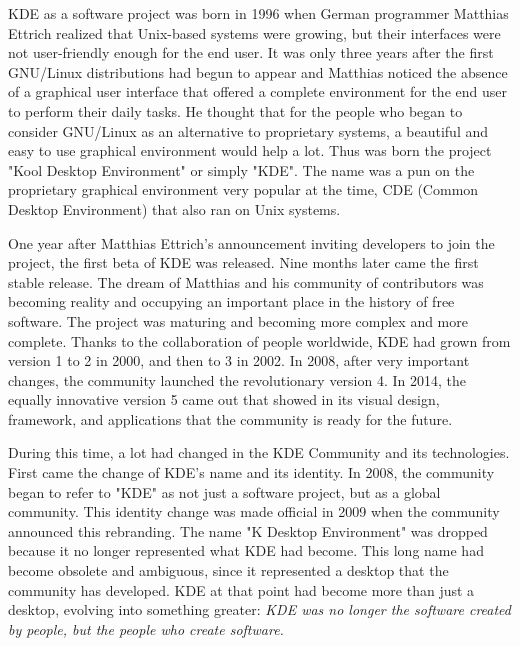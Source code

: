 

\noindent{}KDE as a software project was born in 1996 when German programmer Matthias Ettrich realized that Unix-based systems were growing, but their interfaces were not user-friendly enough for the end user. It was only three years after the first GNU/Linux distributions had begun to appear and Matthias noticed the absence of a graphical user interface that offered a complete environment for the end user to perform their daily tasks. He thought that for the people who began to consider GNU/Linux as an alternative to proprietary systems, a beautiful and easy to use graphical environment would help a lot. Thus was born the project "Kool Desktop Environment" or simply "KDE". The name was a pun on the proprietary graphical environment very popular at the time, CDE (Common Desktop Environment) that also ran on Unix systems.

One year after Matthias Ettrich's announcement inviting developers to join the project, the first beta of KDE was released. Nine months later came the first stable release. The dream of Matthias and his community of contributors was becoming reality and occupying an important place in the history of free software. The project was maturing and becoming more complex and more complete. Thanks to the collaboration of people worldwide, KDE had grown from version 1 to 2 in 2000, and then to 3 in 2002. In 2008, after very important changes, the community launched the revolutionary version 4. In 2014, the equally innovative version 5 came out that showed in its visual design, framework, and applications that the community is ready for the future.

During this time, a lot had changed in the KDE Community and its technologies. First came the change of KDE's name and its identity. In 2008, the community began to refer to "KDE" as not just a software project, but as a global community. This identity change was made official in 2009 when the community announced this rebranding. The name "K Desktop Environment" was dropped because it no longer represented what KDE had become. This long name had become obsolete and ambiguous, since it represented a desktop that the community has developed. KDE at that point had become more than just a desktop, evolving into something greater: \textit{KDE was no longer the software created by people, but the people who create software.} 

